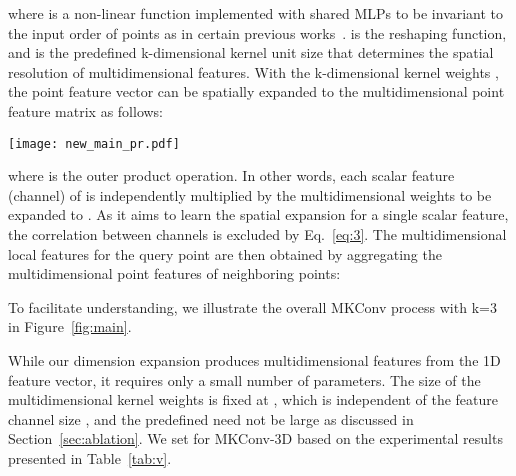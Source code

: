 \documentclass[preprint,12pt]{elsarticle}
\begin{document}
where  is a non-linear function implemented with shared MLPs to be invariant to the input order of points as in certain previous works~\citep{wu2019pointconv,liu2019relation,lin2020fpconv}.  is the reshaping function, and  is the predefined k-dimensional kernel unit size that determines the spatial resolution of multidimensional features. With the k-dimensional kernel weights , the point feature vector  can be spatially expanded to the multidimensional point feature matrix  as follows:\begin{figure*}[t]
	\begin{center}
		\texttt{[image: new\_main\_pr.pdf]}	
	\end{center}
	\vspace{-0.5cm}
	\caption{Overall MKConv-3D (k=3) process on a local point set with number of neighboring points  and kernel unit size . Dimension expansion with the multidimensional kernels is performed using Eq.~\ref{eq:5}, and multidimensional attention is reproduced on the channel axis for an element-wise product with multidimensional local features. Detailed architectures of the multidimensional kernel function and MLA are depicted in Figure~\ref{fig:attention}.
	}
	
	\label{fig:main}
\end{figure*}

where  is the outer product operation.
In other words, each scalar feature (channel) of  is independently multiplied by the multidimensional weights  to be expanded to . As it aims to learn the spatial expansion for a single scalar feature, the correlation between channels is excluded by Eq.~\ref{eq:3}.
The multidimensional local features  for the query point  are then obtained by aggregating the multidimensional point features of neighboring points:

To facilitate understanding, we illustrate the overall MKConv process with k=3 in Figure~\ref{fig:main}.

While our dimension expansion produces multidimensional features from the 1D feature vector, it requires only a small number of parameters. The size of the multidimensional kernel weights is fixed at , which is independent of the feature channel size , and the predefined  need not be large as discussed in Section~\ref{sec:ablation}. We set  for MKConv-3D based on the experimental results presented in Table~\ref{tab:v}.
\end{document}
